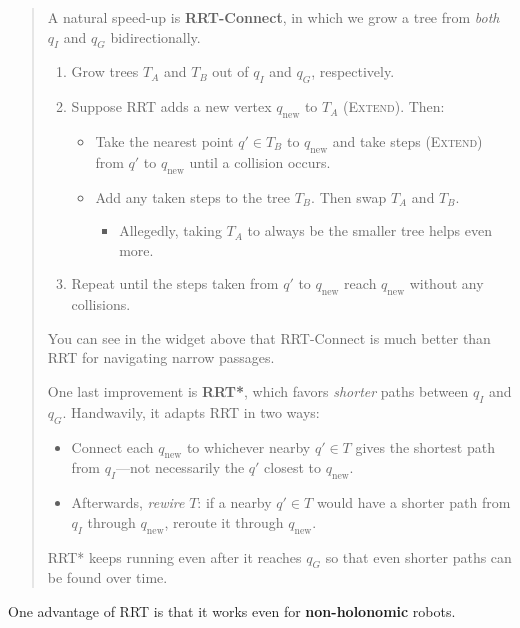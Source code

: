 \begin{quote}
    A natural speed-up is \textbf{RRT-Connect},
    in which we grow a tree from \emph{both} $q_I$ and $q_G$
    bidirectionally.
    \begin{enumerate}
        \item Grow trees $T_A$ and $T_B$ out of $q_I$ and $q_G$,
        respectively.
        \item Suppose RRT adds a new vertex $q_{\mathrm{new}}$ to $T_A$
        (\textsc{Extend}).  Then:
        \begin{itemize}
            \item Take the nearest point $q' \in T_B$ to $q_{\mathrm{new}}$
            and take steps (\textsc{Extend}) from $q'$ to $q_{\mathrm{new}}$
            until a collision occurs.
            \item Add any taken steps to the tree $T_B$.
            Then swap $T_A$ and $T_B$.
            \begin{itemize}
                \item Allegedly, taking $T_A$ to always be the smaller tree
                helps even more.
            \end{itemize}
        \end{itemize}
        \item Repeat until the steps taken from $q'$ to $q_{\mathrm{new}}$
        reach $q_{\mathrm{new}}$ without any collisions.
    \end{enumerate}
    You can see in the widget above that
    RRT-Connect is much better than RRT for
    navigating narrow passages.

    One last improvement is \textbf{RRT*},
    which favors \emph{shorter} paths between $q_I$ and $q_G$.
    Handwavily, it adapts RRT in two ways:
    \begin{itemize}
        \item Connect each $q_{\mathrm{new}}$ to whichever nearby $q' \in T$
        gives the shortest path from $q_I$---not necessarily
        the $q'$ closest to $q_{\mathrm{new}}$.
        \item Afterwards, \emph{rewire} $T$:
        if a nearby $q' \in T$
        would have a shorter path from $q_I$ through $q_{\mathrm{new}}$,
        reroute it through $q_{\mathrm{new}}$.
    \end{itemize}
    RRT* keeps running even after it reaches $q_G$
    so that even shorter paths can be found over time.
\end{quote}

One advantage of RRT is that it works even for \textbf{non-holonomic} robots.

